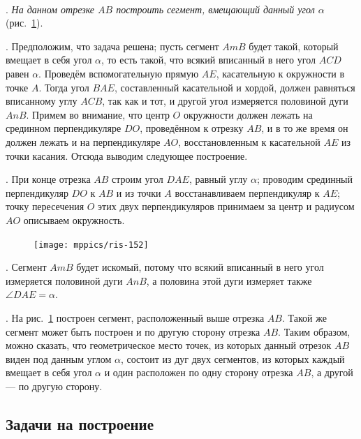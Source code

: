\documentclass[twoside]{book}
\begin{document}
\paragraph{}\label{1938/132}
\mbox{.}
\emph{На данном отрезке $AB$ построить сегмент, вмещающий данный угол $\alpha$} (рис.~\ref{1938/ris-152}).

\smallskip
\mbox{.}
Предположим, что задача решена;
пусть сегмент $AmB$ будет такой, который вмещает в себя угол $\alpha$, то есть такой, что всякий вписанный в него угол $ACD$ равен $\alpha$.
Проведём вспомогательную прямую $AE$, касательную к окружности в точке $A$.
Тогда угол $BAE$, составленный касательной и хордой, должен равняться вписанному углу $ACB$, так как и тот, и другой угол измеряется половиной дуги $AnB$.
Примем во внимание, что центр $O$ окружности должен лежать на срединном перпендикуляре $DO$, проведённом к отрезку $AB$, и в то же время он должен лежать и на перпендикуляре $AO$, восстановленным к касательной $AE$ из точки касания.
Отсюда выводим следующее построение.

\smallskip
\mbox{.}
При конце отрезка $AB$ строим угол $DAE$, равный углу $\alpha$;
проводим срединный перпендикуляр $DO$ к $AB$ и из точки $A$ восстанавливаем перпендикуляр к $AE$; 
точку пересечения $O$ этих двух перпендикуляров принимаем за центр и радиусом $AO$ описываем окружность.

\begin{figure}
\centering
\texttt{[image: mppics/ris-152]}
\caption{}\label{1938/ris-152}
\end{figure}

\smallskip
\mbox{.}
Сегмент $AmB$ будет искомый, потому что всякий вписанный в него угол измеряется половиной дуги $AnB$, а половина этой дуги измеряет также $\angle DAE=\alpha$.

\smallskip
\mbox{.}
На рис.~\ref{1938/ris-152} построен сегмент, расположенный выше отрезка $AB$.
Такой же сегмент может быть построен и по другую сторону отрезка $AB$.
Таким образом, можно сказать, что геометрическое место точек, из которых данный отрезок $AB$ виден под данным углом $\alpha$, состоит из дуг двух сегментов, из которых каждый вмещает в себя угол $\alpha$ и один расположен по одну сторону отрезка $AB$, а другой — по другую сторону.

\subsection*{Задачи на построение}
\end{document}
